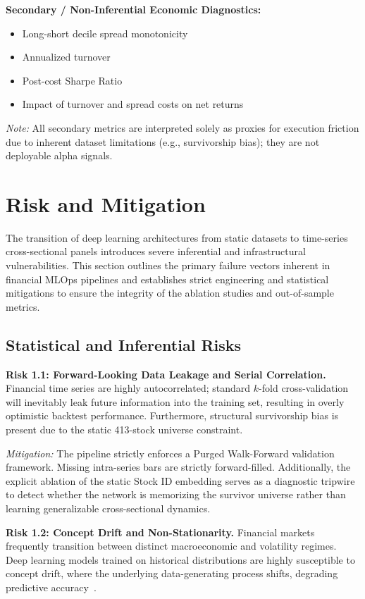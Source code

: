 \documentclass[twoside,final]{hcmut-report}
\begin{document}
\textbf{Secondary / Non-Inferential Economic Diagnostics:}
\begin{itemize}
  \item Long-short decile spread monotonicity
  \item Annualized turnover
  \item Post-cost Sharpe Ratio
  \item Impact of turnover and spread costs on net returns
\end{itemize}

\textit{Note:} All secondary metrics are interpreted solely as proxies for execution friction due to inherent dataset limitations (e.g., survivorship bias); they are not deployable alpha signals.

\section{Risk and Mitigation}

The transition of deep learning architectures from static datasets to time-series cross-sectional panels introduces severe inferential and infrastructural vulnerabilities. This section outlines the primary failure vectors inherent in financial MLOps pipelines and establishes strict engineering and statistical mitigations to ensure the integrity of the ablation studies and out-of-sample metrics.

\subsection{Statistical and Inferential Risks}

\textbf{Risk 1.1: Forward-Looking Data Leakage and Serial Correlation.} Financial time series are highly autocorrelated; standard $k$-fold cross-validation will inevitably leak future information into the training set, resulting in overly optimistic backtest performance. Furthermore, structural survivorship bias is present due to the static 413-stock universe constraint.

\textit{Mitigation:} The pipeline strictly enforces a Purged Walk-Forward validation framework. Missing intra-series bars are strictly forward-filled. Additionally, the explicit ablation of the static Stock ID embedding serves as a diagnostic tripwire to detect whether the network is memorizing the survivor universe rather than learning generalizable cross-sectional dynamics.

\textbf{Risk 1.2: Concept Drift and Non-Stationarity.} Financial markets frequently transition between distinct macroeconomic and volatility regimes. Deep learning models trained on historical distributions are highly susceptible to concept drift, where the underlying data-generating process shifts, degrading predictive accuracy~\cite{Dixon2020}.
\end{document}
